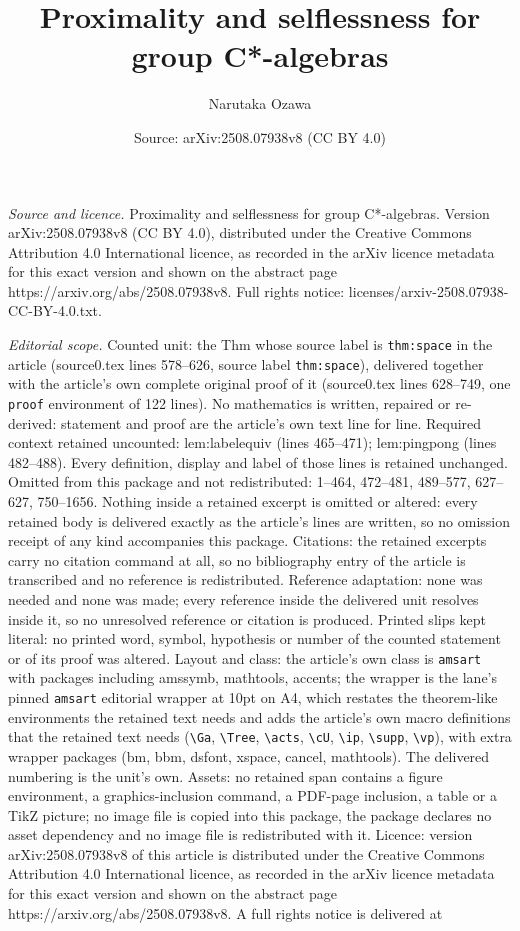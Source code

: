 \documentclass[10pt,a4paper]{amsart}
\title[Proximality and selflessness for group C*-algebras]{Proximality and selflessness for group C*-algebras}
\author{Narutaka Ozawa}
\date{Source: arXiv:2508.07938v8 (CC BY 4.0)}
\begin{document}
\maketitle

\noindent\emph{Source and licence.} Proximality and selflessness for group C*-algebras. Version arXiv:2508.07938v8 (CC BY 4.0), distributed under the Creative Commons Attribution 4.0 International licence, as recorded in the arXiv licence metadata for this exact version and shown on the abstract page https://arxiv.org/abs/2508.07938v8. Full rights notice: licenses/arxiv-2508.07938-CC-BY-4.0.txt.\par\smallskip

\noindent\textit{Editorial scope.} Counted unit: the Thm whose source label is \texttt{thm:space} in the article (source0.tex lines 578--626, source label \texttt{thm:space}), delivered together with the article's own complete original proof of it (source0.tex lines 628--749, one \texttt{proof} environment of 122 lines). No mathematics is written, repaired or re-derived: statement and proof are the article's own text line for line. Required context retained uncounted: lem:labelequiv (lines 465--471); lem:pingpong (lines 482--488). Every definition, display and label of those lines is retained unchanged. Omitted from this package and not redistributed: 1--464, 472--481, 489--577, 627--627, 750--1656. Nothing inside a retained excerpt is omitted or altered: every retained body is delivered exactly as the article's lines are written, so no omission receipt of any kind accompanies this package. Citations: the retained excerpts carry no citation command at all, so no bibliography entry of the article is transcribed and no reference is redistributed. Reference adaptation: none was needed and none was made; every reference inside the delivered unit resolves inside it, so no unresolved reference or citation is produced. Printed slips kept literal: no printed word, symbol, hypothesis or number of the counted statement or of its proof was altered. Layout and class: the article's own class is \texttt{amsart} with packages including amssymb, mathtools, accents; the wrapper is the lane's pinned \texttt{amsart} editorial wrapper at 10pt on A4, which restates the theorem-like environments the retained text needs and adds the article's own macro definitions that the retained text needs (\texttt{\textbackslash Ga}, \texttt{\textbackslash Tree}, \texttt{\textbackslash acts}, \texttt{\textbackslash cU}, \texttt{\textbackslash ip}, \texttt{\textbackslash supp}, \texttt{\textbackslash vp}), with extra wrapper packages (bm, bbm, dsfont, xspace, cancel, mathtools). The delivered numbering is the unit's own. Assets: no retained span contains a figure environment, a graphics-inclusion command, a PDF-page inclusion, a table or a TikZ picture; no image file is copied into this package, the package declares no asset dependency and no image file is redistributed with it. Licence: version arXiv:2508.07938v8 of this article is distributed under the Creative Commons Attribution 4.0 International licence, as recorded in the arXiv licence metadata for this exact version and shown on the abstract page https://arxiv.org/abs/2508.07938v8. A full rights notice is delivered at 
\end{document}

